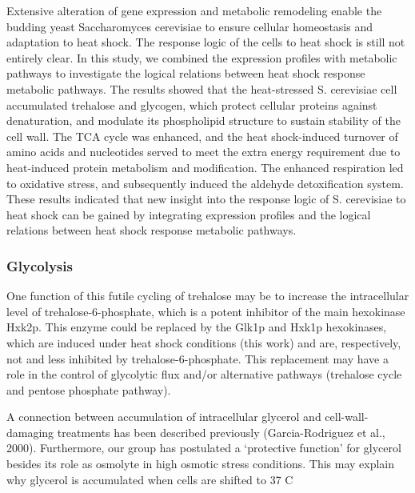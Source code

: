 \documentclass{pracamgr}
\begin{document}
Extensive alteration of gene expression and metabolic remodeling enable the budding yeast Saccharomyces cerevisiae to
ensure cellular homeostasis and adaptation to heat shock. The response logic of the cells to heat shock is still not entirely clear. 
In this study, we combined the expression profiles with metabolic pathways to investigate the logical relations between heat shock response metabolic pathways. 
The results showed that the heat-stressed S. cerevisiae cell accumulated trehalose and glycogen, which protect cellular proteins against denaturation, and modulate 
its phospholipid structure to sustain stability of the cell wall. The TCA cycle was enhanced, and the heat shock-induced turnover of amino acids
and nucleotides served to meet the extra energy requirement due to heat-induced protein metabolism and modification. The enhanced respiration led
to oxidative stress, and subsequently induced the aldehyde detoxification system. These results indicated that new insight into the response logic
of S. cerevisiae to heat shock can be gained by integrating expression profiles and the logical relations between heat shock response metabolic pathways.\cite{ResponseLogic}
\subsubsection{Glycolysis}

One function of this futile cycling
of trehalose may be to increase the intracellular level of
trehalose-6-phosphate, which is a potent inhibitor of the
main hexokinase Hxk2p. This enzyme could be replaced by the Glk1p
and Hxk1p hexokinases, which are induced under heat
shock conditions (this work) and are, respectively, not and
less inhibited by trehalose-6-phosphate. This replacement may have a role in the control of
glycolytic flux and/or alternative pathways (trehalose cycle
and pentose phosphate pathway).\cite{MsnContraHsf1}

A connection between accumulation of intracellular
glycerol and cell-wall-damaging treatments has been
described previously (Garcia-Rodriguez et al., 2000).
Furthermore, our group has postulated a ‘protective
function’ for glycerol besides its role as osmolyte in high
osmotic stress conditions. This may explain why glycerol
is accumulated when cells are shifted to 37 C \cite{GlycerolAccumulate}
\end{document}
